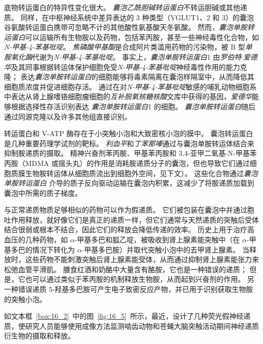 底物转运蛋白的特异性变化很大。
\textit{囊泡乙酰胆碱转运蛋白}不转运胆碱或其他递质。
同样，在中枢神经系统中差异表达的 3 种类型（VGLUT1、2 和 3）的囊泡谷氨酸转运蛋白携带可忽略不计的其他酸性氨基酸天冬氨酸。
然而，\textit{囊泡单胺转运蛋白}可以运输所有生物胺以及药物，包括苯丙胺，甚至一些神经毒性化合物，如\textit{N-甲基-4-苯基吡啶}。
\textit{焦磷酸甲基酯}是合成阿片类滥用药物的污染物，被 B 型\textit{单胺氧化酶}代谢为\textit{N-甲基-4-苯基吡啶}。
事实上，\textit{囊泡单胺转运蛋白}1 由\textit{罗伯特$\cdot$爱德华}及其同事根据转运体保护细胞免受\textit{N-甲基-4-苯基吡啶}神经毒性作用的能力克隆；
表达\textit{囊泡单胺转运蛋白}的细胞能够将毒素隔离在囊泡样隔室中，从而降低其细胞质浓度并促进细胞存活。
通过在对\textit{N-甲基-4-苯基吡啶}敏感的哺乳动物细胞系中表达从肾上腺嗜铬细胞瘤细胞的\textit{互补脱氧核糖核酸}文库中获得的基因，\textit{爱德华}能够根据选择性存活识别表达 \textit{囊泡单胺转运蛋白}1 的细胞。
\textit{囊泡单胺转运蛋白}随后通过同源克隆以及许多其他组直接识别。


转运蛋白和 V-ATP 酶存在于小突触小泡和大致密核小泡的膜中。
囊泡转运蛋白是几种重要药理学试剂的靶标。
\textit{利血平}和\textit{丁苯那嗪}通过与囊泡单胺转运体结合来抑制胺递质的摄取。
精神兴奋剂苯丙胺、甲基苯丙胺和 3,4-亚甲二氧基-N-甲基苯丙胺（MDMA 或摇头丸）的作用是消耗胺递质分子的囊泡，但也导致它们通过细胞质膜生物胺转运体从细胞质流出到细胞外空间，见下文）。
这些化合物通过\textit{囊泡单胺转运蛋白} 介导的质子反向驱动运输在囊泡内积累，这减少了将胺递质加载到囊泡中所需的质子梯度。


与正常递质物质足够相似的药物可以作为假递质。
它们被包装在囊泡中并通过胞吐作用释放，就好像它们是真正的递质一样，但它们通常与天然递质的突触后受体结合很弱或根本不结合，因此它们的释放会降低传递的效率。
历史上用于治疗高血压的几种药物，如 $\alpha$-甲基多巴和胍乙啶，被吸收到肾上腺素能突触中（在 $\alpha$-甲基多巴的情况下转化为 $\alpha$-甲基多巴胺）并取代突触小泡中的去甲肾上腺素。
当释放时，这些药物不能刺激突触后肾上腺素能受体，从而通过抑制肾上腺素能张力来松弛血管平滑肌。
膳食红酒和奶酪中大量含有酪胺，它也是一种错误的递质；
但是，它也可以通过类似于苯丙胺的机制释放生物胺，从而起到兴奋剂的作用。
另一种错误递质 5-羟基多巴胺可产生电子致密反应产物，并已用于识别获取生物胺的突触小泡。


如文本框~\ref{box:16_2}~中的图~\ref{fig:16_5}~所示，最近，设计了几种荧光假神经递质，使研究人员能够使用成像方法监测啮齿动物和苍蝇大脑突触活动期间神经递质衍生物的摄取和释放。



